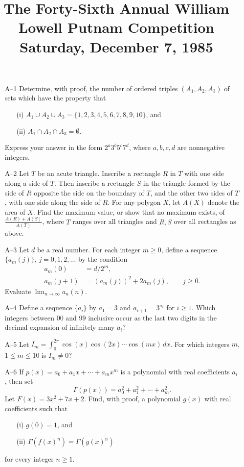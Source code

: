 \documentclass[amssymb,twocolumn,pra,10pt,aps]{revtex4-1}
\begin{document}
\title{The Forty-Sixth Annual William Lowell Putnam Competition \\
    Saturday, December 7, 1985}
\maketitle

\begin{itemize}
\item[A--1]
Determine, with proof, the number of ordered triples $(A_1, A_2, A_3)$
of sets which have the property that
\begin{enumerate}
\item[(i)] $A_1 \cup A_2 \cup A_3 = \{1,2,3,4,5,6,7,8,9,10\}$, and
\item[(ii)] $A_1 \cap A_2 \cap A_3 = \emptyset$.
\end{enumerate}
Express your answer in the form $2^a 3^b 5^c 7^d$, where $a,b,c,d$
are nonnegative integers.

\item[A--2]
Let $T$ be an acute triangle. Inscribe a rectangle $R$ in $T$ with one
side along a side of $T$. Then inscribe a rectangle $S$ in the triangle
formed by the side of $R$ opposite the side on the boundary of $T$,
and the other two sides of $T$, with one side along the side of
$R$. For any polygon $X$, let $A(X)$ denote the area of $X$. Find the
maximum value, or show that no maximum exists, of
$\frac{A(R)+A(S)}{A(T)}$, where $T$ ranges over all triangles and
$R,S$ over all rectangles as above.

\item[A--3]
Let $d$ be a real number. For each integer $m \geq 0$, define a
sequence $\{a_m(j)\}$, $j=0,1,2,\dots$ by the condition
\begin{align*}
a_m(0) &= d/2^m, \\
a_m(j+1) &= (a_m(j))^2 + 2a_m(j), \qquad j \geq 0.
\end{align*}
Evaluate $\lim_{n \to \infty} a_n(n)$.

\item[A--4]
Define a sequence $\{a_i\}$ by $a_1=3$ and $a_{i+1}=3^{a_i}$ for
$i\geq 1$. Which integers between 00 and 99 inclusive occur as the
last two digits in the decimal expansion of infinitely many $a_i$?

\item[A--5]
Let $I_m = \int_0^{2\pi} \cos(x)\cos(2x)\cdots \cos(mx)\,dx$. For
which integers $m$, $1 \leq m \leq 10$ is $I_m \neq 0$?

\item[A--6]
If $p(x)= a_0 + a_1 x + \cdots + a_m x^m$ is a polynomial with real
coefficients $a_i$, then set
\[
\Gamma(p(x)) = a_0^2 + a_1^2 + \cdots + a_m^2.
\]
Let $F(x) = 3x^2+7x+2$. Find, with proof, a polynomial $g(x)$ with
real coefficients such that
\begin{enumerate}
\item[(i)] $g(0)=1$, and
\item[(ii)] $\Gamma(f(x)^n) = \Gamma(g(x)^n)$
\end{enumerate}
for every integer $n \geq 1$.


\end{itemize}
\end{document}
